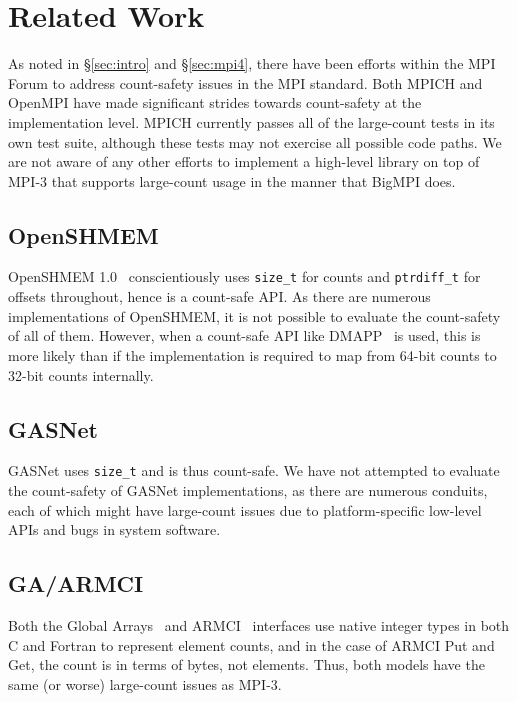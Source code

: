 
\section{Related Work}

As noted in \S\ref{sec:intro} and \S\ref{sec:mpi4}, there have been efforts within
the MPI Forum to address count-safety issues in the MPI standard.
Both MPICH and OpenMPI have made significant strides towards count-safety
at the implementation level.  MPICH currently passes all of the large-count tests
in its own test suite, although these tests may not exercise all possible code paths.
We are not aware of any other efforts to implement a high-level library on top of
MPI-3 that supports large-count usage in the manner that BigMPI does.

\subsection{OpenSHMEM}

OpenSHMEM 1.0~\cite{kuehn2012openshmem} conscientiously uses \texttt{size\_t} for
counts and \texttt{ptrdiff\_t} for offsets throughout, hence is a count-safe API.
As there are numerous implementations of OpenSHMEM, it is not possible to evaluate
the count-safety of all of them.
However, when a count-safe API like DMAPP~\cite{DMAPP} is used, this is more likely
than if the implementation is required to map from 64-bit counts to 32-bit counts internally.

\subsection{GASNet}

GASNet uses \texttt{size\_t} and is thus count-safe.  We have not attempted to evaluate
the count-safety of GASNet implementations, as there are numerous conduits, each of
which might have large-count issues due to platform-specific low-level APIs and
bugs in system software.

\subsection{GA/ARMCI}

Both the Global Arrays~\cite{nieplocha:94} and ARMCI~\cite{nieplocha:99} interfaces
use native integer types in both C and Fortran to represent element counts, and
in the case of ARMCI Put and Get, the count is in terms of bytes, not elements.
Thus, both models have the same (or worse) large-count issues as MPI-3.